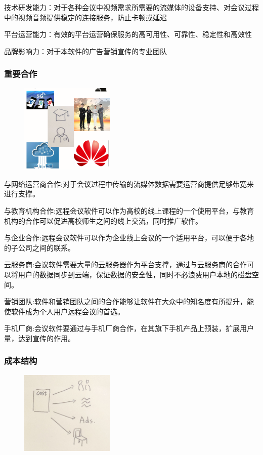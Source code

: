 \documentclass[a4paper,12pt]{article}
\begin{document}
    技术研发能力：对于各种会议中视频需求所需要的流媒体的设备支持、对会议过程中的视频音频提供稳定的连接服务，防止卡顿或延迟
    
    平台运营能力：有效的平台运营确保服务的高可用性、可靠性、稳定性和高效性

    品牌影响力：对于本软件的广告营销宣传的专业团队
    \subsubsection{重要合作}

    \begin{figure}[H]
        \centering
        \includegraphics[width=0.4\textwidth]{重要合作.png}
    \end{figure}
    
    与网络运营商合作:对于会议过程中传输的流媒体数据需要运营商提供足够带宽来进行支撑。
    
    与教育机构合作:远程会议软件可以作为高校的线上课程的一个使用平台，与教育机构的合作可以促进高校师生之间的线上交流，同时推广软件。 
    
    与企业合作:远程会议软件可以作为企业线上会议的一个适用平台，可以便于各地的子公司之间的联系。
    
    云服务商:会议软件需要大量的云服务器作为平台支撑，通过与云服务商的合作可以将用户的数据同步到云端，保证数据的安全性，同时不必浪费用户本地的磁盘空间。
    
    营销团队:软件和营销团队之间的合作能够让软件在大众中的知名度有所提升，能使软件成为个人用户远程会议的首选。
    
    手机厂商:会议软件要通过与手机厂商合作，在其旗下手机产品上预装，扩展用户量，达到宣传的作用。
    \subsubsection{成本结构}

    \begin{figure}[H]
        \centering
        \includegraphics[width=0.4\textwidth]{成本结构.jpg}
    \end{figure}
    
\end{document}
